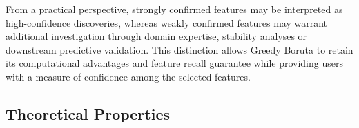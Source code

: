\documentclass[runningheads]{llncs}
\begin{document}
From a practical perspective, strongly confirmed features may be interpreted as high-confidence discoveries, whereas weakly confirmed features may warrant additional investigation through domain expertise, stability analyses or downstream predictive validation. This distinction allows Greedy Boruta to retain its computational advantages and feature recall guarantee while providing users with a measure of confidence among the selected features.

\subsection{Theoretical Properties}
\label{sec:method:theory}

\end{document}
